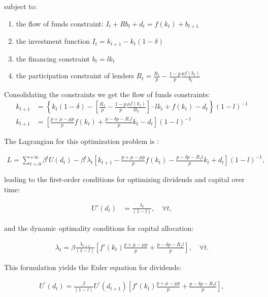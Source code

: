 \documentclass[12pt]{report}
\begin{document}
subject to:
\begin{enumerate}
    \item the flow of funds constraint: \(I_t + R b_{t} + d_t = f(k_t) + b_{t+1}\)
    \item the investment function \(I_t = k_{t+1} - k_{t}\left(1-\delta\right)\) 
    \item the financing constraint \(b_t=l k_t\)
    \item the participation constraint of lenders \(R_t=\frac{R_f}{p}  -\frac{ 1-p }{ p }\frac{\mu f(k_t)}{b_t}\)
\end{enumerate}
Consolidating the constraints we get the flow of funds constraints:
\begin{align}
    k_{t+1} &= \left\{k_{t}(1 - \delta) - \left[\frac{R_f}{p}  -\frac{ 1-p }{ p }\frac{\mu f(k_{t})}{l  k_{t}}\right] \cdot l k_{t} + f(k_{t}) - d_{t} \right \}{\left(1-l\right)}^{-1} \nonumber \\
    k_{t+1} &= \left[ \frac{p + \mu - \mu p}{p}f(k_{t}) + \frac{p - \delta p - R_f l}{p} k_{t}  - d_{t} \right](1-l)^{-1} \label{eq:ff}
\end{align}

The Lagrangian for this optimization problem is :

\begin{align}
L=\sum_{t=0}^{+\infty}\beta^t U(d_t) - \beta^t \lambda_t\left[ k_{t+1} - \frac{p + \mu - \mu p}{p}f(k_{t}) - \frac{p - \delta p - R_f l}{p} k_{t}  + d_{t} \right](1-l)^{-1},
\end{align}

leading to the first-order conditions for optimizing dividends and capital over time:


\begin{align}
    U'(d_t) &= \frac{\lambda_t}{\left(1-l\right)}, \quad \forall t,
\end{align}


and the dynamic optimality conditions for capital allocation:


\begin{align}
    \lambda_t = \beta \frac{\lambda_{t+1}}{\left(1-l\right)} \left[ f'(k_{t})\frac{p + \mu - \mu p}{p} + \frac{p - \delta p - R_f l}{p} \right], \quad \forall t.
\end{align}


This formulation yields the Euler equation for dividends:

\begin{align}
U^{\prime}(d_{t})=\frac{\beta}{\left(1-l\right)} U^{\prime}(d_{t+1})\left[ f'(k_{t})\frac{p + \mu - \mu p}{p} + \frac{p - \delta p - R_f l}{p} \right],
\end{align}
\end{document}
